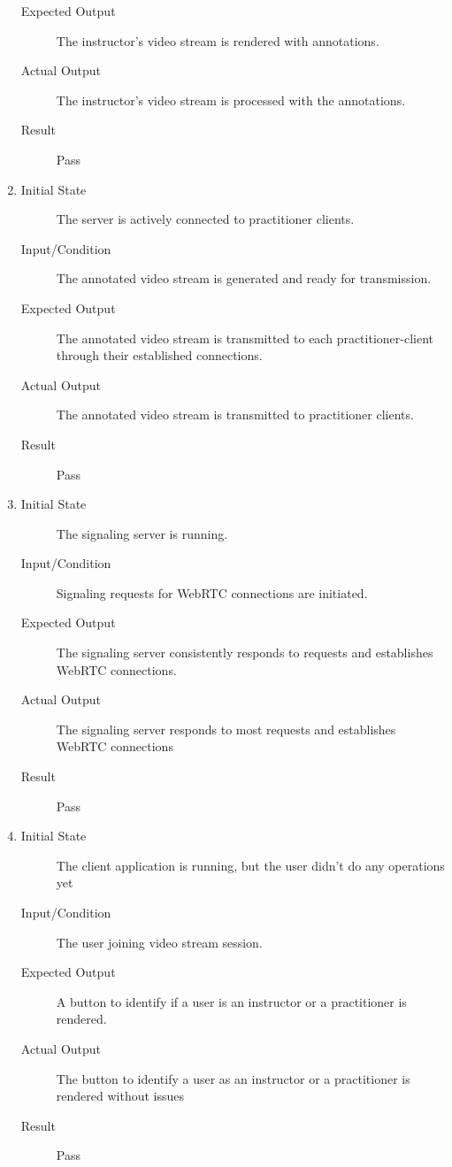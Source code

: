 \documentclass[12pt, titlepage]{article}
\begin{document}
\begin{enumerate}[FR-T1]
\begin{description}
    \item[Expected Output] The instructor's video stream is rendered with
      annotations.
    \item[Actual Output] The instructor's video stream is processed with the 
    annotations.
    \item[Result] Pass
    \end{description}
  \item \label{FRT10}
    \begin{description}
    \item[Initial State] The server is actively connected to practitioner clients.
    \item[Input/Condition] The annotated video stream is generated and ready for
      transmission.
    \item[Expected Output] The annotated video stream is transmitted to each
      practitioner-client through their established connections.
    \item[Actual Output] The annotated video stream is transmitted to practitioner clients.
    \item[Result] Pass
    \end{description}
  \item \label{FRT11}
    \begin{description}
    \item[Initial State] The signaling server is running.
    \item[Input/Condition] Signaling requests for WebRTC connections are initiated.
    \item[Expected Output] The signaling server consistently responds to requests and
      establishes WebRTC connections.
    \item[Actual Output] The signaling server responds to most requests and establishes WebRTC connections
    \item[Result] Pass
    \end{description}
  \item \label{FRT12}
    \begin{description}
    \item[Initial State] The client application is running, but the user didn’t do
      any operations yet
    \item[Input/Condition] The user joining video stream session.
    \item[Expected Output] A button to identify if a user is an instructor or a
      practitioner is rendered.
    \item[Actual Output] The button to identify a user as an instructor or a 
    practitioner is rendered without issues
    \item[Result] Pass
    \end{description}
  \end{enumerate}
\end{document}
